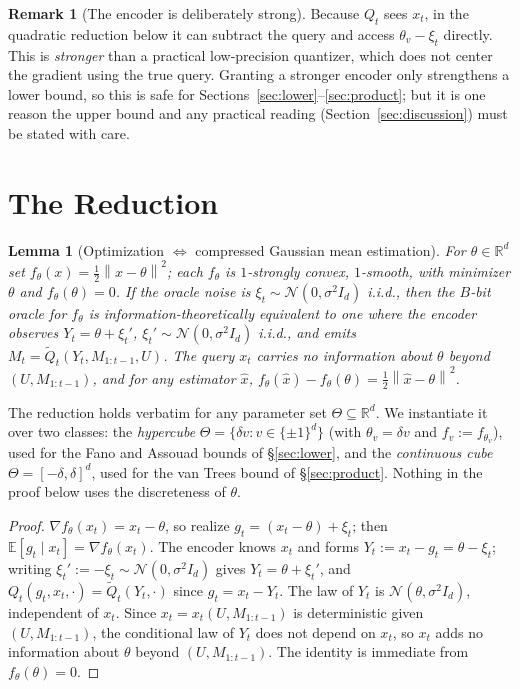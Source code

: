 \documentclass[11pt]{article}
\newtheorem{lemma}{Lemma}
\theoremstyle{definition}
\newtheorem{remark}{Remark}
\newcommand{\R}{\mathbb{R}}
\newcommand{\E}{\mathbb{E}}
\newcommand{\norm}[1]{\left\lVert #1 \right\rVert}
\newcommand{\Ncal}{\mathcal{N}}
\begin{document}
\begin{remark}[The encoder is deliberately strong]
\label{rem:strong}
Because $Q_t$ sees $x_t$, in the quadratic reduction below it can subtract the query and access
$\theta_v-\xi_t$ directly. This is \emph{stronger} than a practical low-precision quantizer, which does
not center the gradient using the true query. Granting a stronger encoder only strengthens a lower
bound, so this is safe for Sections~\ref{sec:lower}--\ref{sec:product}; but it is one reason the
upper bound and any practical reading (Section~\ref{sec:discussion}) must be stated with care.
\end{remark}

\section{The Reduction}
\label{sec:reduction}

\begin{lemma}[Optimization $\Longleftrightarrow$ compressed Gaussian mean estimation]
\label{lem:reduction}
For $\theta\in\R^d$ set $f_\theta(x)=\tfrac12\norm{x-\theta}^2$; each $f_\theta$ is $1$-strongly convex,
$1$-smooth, with minimizer $\theta$ and $f_\theta(\theta)=0$. If the oracle noise is
$\xi_t\sim\Ncal(0,\sigma^2 I_d)$ i.i.d., then the $B$-bit oracle for $f_\theta$ is
information-theoretically equivalent to one where the encoder observes $Y_t=\theta+\xi_t'$,
$\xi_t'\sim\Ncal(0,\sigma^2 I_d)$ i.i.d., and emits $M_t=\tilde Q_t(Y_t,M_{1:t-1},U)$. The query $x_t$
carries no information about $\theta$ beyond $(U,M_{1:t-1})$, and for any estimator $\hat x$,
$f_\theta(\hat x)-f_\theta(\theta)=\tfrac12\norm{\hat x-\theta}^2$.
\end{lemma}

\noindent The reduction holds verbatim for any parameter set $\Theta\subseteq\R^d$. We instantiate it
over two classes: the \emph{hypercube} $\Theta=\{\delta v:v\in\{\pm1\}^d\}$ (with $\theta_v=\delta v$ and
$f_v:=f_{\theta_v}$),
used for the Fano and Assouad bounds of \S\ref{sec:lower}, and the \emph{continuous cube}
$\Theta=[-\delta,\delta]^d$, used for the van Trees bound of \S\ref{sec:product}. Nothing in the proof
below uses the discreteness of $\theta$.

\begin{proof}
$\nabla f_\theta(x_t)=x_t-\theta$, so realize $g_t=(x_t-\theta)+\xi_t$; then $\E[g_t\mid x_t]=\nabla f_\theta(x_t)$.
The encoder knows $x_t$ and forms $Y_t:=x_t-g_t=\theta-\xi_t$; writing $\xi_t':=-\xi_t\sim\Ncal(0,\sigma^2 I_d)$
gives $Y_t=\theta+\xi_t'$, and $Q_t(g_t,x_t,\cdot)=\tilde Q_t(Y_t,\cdot)$ since $g_t=x_t-Y_t$. The law
of $Y_t$ is $\Ncal(\theta,\sigma^2 I_d)$, independent of $x_t$. Since $x_t=x_t(U,M_{1:t-1})$ is
deterministic given $(U,M_{1:t-1})$, the conditional law of $Y_t$ does not depend on $x_t$, so $x_t$ adds
no information about $\theta$ beyond $(U,M_{1:t-1})$. The identity is immediate from $f_\theta(\theta)=0$.
\end{proof}
\end{document}
